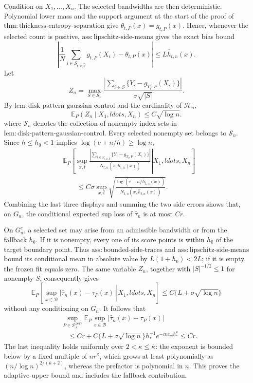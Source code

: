 Condition on \(X_1,\ldots,X_n\).  The selected bandwidths are then deterministic.  Polynomial lower mass and the support argument at the start of the proof of \(\mathrm{thm:thickness\text{-}entropy\text{-}separation}\) give \(\theta_{t,P}(x)=g_{t,P}(x)\).  Hence, whenever the selected count is positive, \(\mathrm{ass:lipschitz\text{-}side\text{-}means}\) gives the exact bias bound
\[
 \left|
 \frac1N\sum_{i\in S_{t,x,\widehat h}}g_{t,P}(X_i)-\theta_{t,P}(x)
 \right|
 \le L\widehat h_{t,n}(x).
\]
Let
\[
 Z_n=\max_{S\in\mathcal S_n}
 \frac{|\sum_{i\in S}\{Y_i-g_{T_i,P}(X_i)\}|}{\sigma\sqrt{|S|}}.
\]
By \(\mathrm{lem:disk\text{-}pattern\text{-}gaussian\text{-}control}\) and the cardinality of \(\mathcal H_n\),
\[
 \mathbb E_P(Z_n\mid X_1,ldots,X_n)\le C\sqrt{\log n}.
\]
where \(\mathcal S_n\) denotes the collection of nonempty index sets in \(\mathrm{lem:disk\text{-}pattern\text{-}gaussian\text{-}control}\).  Every selected nonempty set belongs to \(\mathcal S_n\).  Since \(h\le h_0<1\) implies \(\log(e+n/h)\ge\log n\),
\[
 \begin{aligned}
 &\mathbb E_P\left[
 \left.
 \sup_{x,t}
 \frac{|\sum_{i\in S_{t,x,\widehat h}}\{Y_i-g_{T_i,P}(X_i)\}|}
 {N_{t,n}(x,\widehat h_{t,n}(x))}
 \right|X_1,ldots,X_n\right]\\
 &\qquad\le C\sigma\sup_{x,t}
 \sqrt{\frac{\log(e+n/\widehat h_{t,n}(x))}
 {N_{t,n}(x,\widehat h_{t,n}(x))}}.
 \end{aligned}
\]
Combining the last three displays and summing the two side errors shows that, on \(G_n\), the conditional expected sup loss of \(\widehat\tau_n\) is at most \(Cr\).

On \(G_n^c\), a selected set may arise from an admissible bandwidth or from the fallback \(h_0\).  If it is nonempty, every one of its score points is within \(h_0\) of the target boundary point.  Thus \(\mathrm{ass:bounded\text{-}side\text{-}traces}\) and \(\mathrm{ass:lipschitz\text{-}side\text{-}means}\) bound its conditional mean in absolute value by \(L(1+h_0)<2L\); if it is empty, the frozen fit equals zero.  The same variable \(Z_n\), together with \(|S|^{-1/2}\le1\) for nonempty \(S\), consequently gives
\[
 \mathbb E_P\left[
 \left.\sup_{x\in\mathcal B}|\widehat\tau_n(x)-\tau_P(x)|
 \right|X_1,ldots,X_n\right]
 \le C\{L+\sigma\sqrt{\log n}\}
\]
without any conditioning on \(G_n\).  It follows that
\[
 \begin{aligned}
 &\sup_{P\in\mathcal P_\kappa^{\mathrm{perv}}}
 \mathbb E_P\sup_{x\in\mathcal B}|\widehat\tau_n(x)-\tau_P(x)|\\
 &\quad\le Cr+C\{L+\sigma\sqrt{\log n}\}
 h_*^{-1}e^{-c n c_mh_*^\kappa}
 \le Cr.
 \end{aligned}
\]
The last inequality holds uniformly over \(2<\kappa\le\overline\kappa\): the exponent is bounded below by a fixed multiple of \(n r^\kappa\), which grows at least polynomially as \((n/\log n)^{2/(\overline\kappa+2)}\), whereas the prefactor is polynomial in \(n\).  This proves the adaptive upper bound and includes the fallback contribution.

